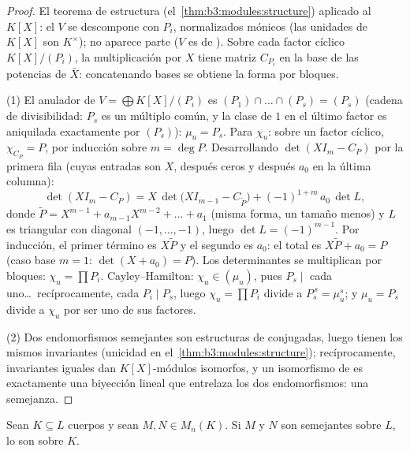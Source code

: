 \begin{proof}
El teorema de estructura (el~\cref{thm:b3:modules:structure}) aplicado
al  $K[X]$: el
 $V$ se descompone con
 $P_i$, normalizados
mónicos (las unidades de $K[X]$ son $K^\times$); no aparece parte
 ($V$ es de
). Sobre cada factor cíclico
$K[X]/(P_i)$, la multiplicación por $X$ tiene matriz $C_{P_i}$ en la
base de las potencias de $\bar X$: concatenando bases se obtiene la
forma por bloques.

(1) El anulador de $V = \bigoplus K[X]/(P_i)$ es $(P_1)\cap
\dots\cap(P_s) = (P_s)$ (cadena de divisibilidad: $P_s$ es un múltiplo
común, y la clase de $1$ en el último factor es aniquilada exactamente
por $(P_s)$): $\mu_u = P_s$. Para $\chi_u$: sobre un factor cíclico,
$\chi_{C_P} = P$, por inducción sobre $m = \deg P$. Desarrollando
$\det(XI_m - C_P)$ por la primera fila (cuyas entradas son $X$, después
ceros y después $a_0$ en la última columna):
\[
\det(XI_m - C_P) = X\,\det\bigl(XI_{m-1} - C_{\tilde P}\bigr)
+ (-1)^{1+m}\,a_0\,\det L ,
\]
donde $\tilde P = X^{m-1} + a_{m-1}X^{m-2} + \dots + a_1$ (misma forma,
un tamaño menos) y $L$ es triangular con diagonal $(-1, \dots, -1)$,
luego $\det L = (-1)^{m-1}$. Por inducción, el primer término es
$X\tilde P$ y el segundo es $a_0$: el total es $X\tilde P + a_0 = P$
(caso base $m=1$: $\det(X + a_0) = P$). Los determinantes se multiplican
por bloques: $\chi_u = \prod P_i$. Cayley--Hamilton:
$\chi_u \in (\mu_u)$, pues $P_s \mid$ cada uno\dots\ recíprocamente,
cada $P_i \mid P_s$, luego $\chi_u = \prod P_i$ divide a
$P_s^{\,s} = \mu_u^s$; y $\mu_u =
P_s$ divide a $\chi_u$ por ser uno de sus factores.

(2) Dos endomorfismos semejantes son estructuras de
 conjugadas, luego tienen los
mismos invariantes (unicidad en el~\cref{thm:b3:modules:structure});
recíprocamente, invariantes iguales dan $K[X]$-módulos isomorfos, y un
isomorfismo de  es exactamente
una biyección lineal que entrelaza los dos endomorfismos: una semejanza.
\end{proof}

\begin{corollary}
\label{cor:b3:modules:descent}
Sean $K \subseteq L$ cuerpos y sean $M, N \in M_n(K)$. Si $M$ y $N$ son
semejantes sobre $L$, lo son sobre $K$.
\end{corollary}

